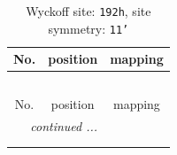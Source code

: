 \documentclass[fleqn,8pt]{jsarticle}
\begin{document}
\renewcommand{\arraystretch}{1.2}
\begin{longtable}{ccc}
\caption{Wyckoff site: {\tt 192h}, site symmetry: {\tt 11'}}
 \\
 \hline \hline
No. & position & mapping \\ \hline \endfirsthead

\multicolumn{2}{l}{\tablename\ \thetable{}} \\
 \hline \hline
No. & position & mapping \\ \hline \endhead

 \hline \hline
\multicolumn{2}{r}{\footnotesize\it continued ...} \\ \endfoot

 \hline \hline
\multicolumn{2}{r}{} \\ \endlastfoot


\end{longtable}
\end{document}
